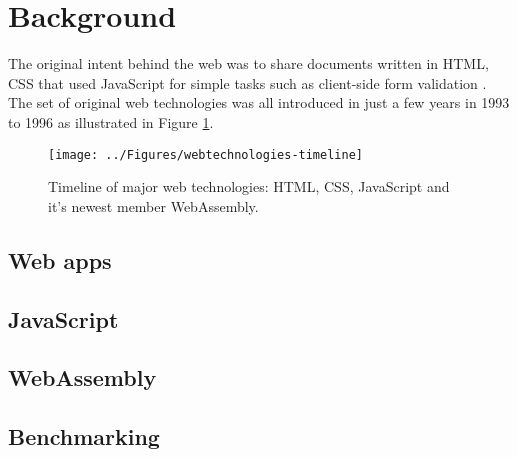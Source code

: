\section{Background}
\label{background}

The original intent behind the web was to share documents written in HTML, CSS that used JavaScript for simple tasks such as client-side form validation \parencite{Zakai2018,Moller2018}. The set of original web technologies was all introduced in just a few years in 1993 to 1996 as illustrated in Figure \ref{figure:webtechnologies-timeline}.



\begin{figure}[!h]
\centering
\texttt{[image: ../Figures/webtechnologies-timeline]}
\caption{Timeline of major web technologies: HTML, CSS, JavaScript and it's newest member WebAssembly.}
\label{figure:webtechnologies-timeline}
\end{figure}

\subsection{Web apps}


\subsection{JavaScript}


\subsection{WebAssembly}


\subsection{Benchmarking}

